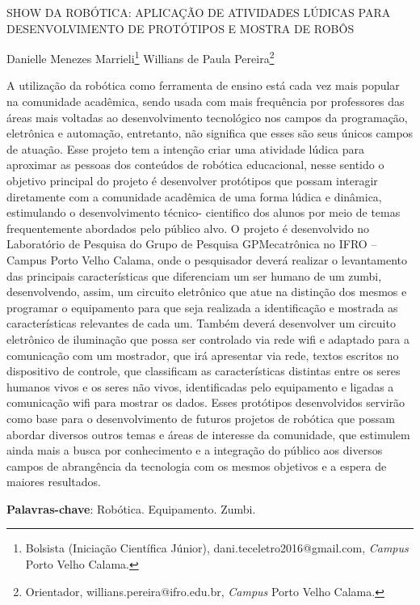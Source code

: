 \documentclass[article,12pt,onesidea,4paper,english,brazil]{abntex2}
\begin{document}
	
	
	\frenchspacing 
	
	\begin{center}
		\LARGE SHOW DA ROBÓTICA: APLICAÇÃO DE ATIVIDADES LÚDICAS PARA DESENVOLVIMENTO DE PROTÓTIPOS E MOSTRA DE ROBÔS
		
		\normalsize
		Danielle Menezes Marrieli\footnote{Bolsista (Iniciação Científica Júnior), dani.teceletro2016@gmail.com, \textit{Campus} Porto Velho Calama.} 
		Willians de Paula Pereira\footnote{Orientador, willians.pereira@ifro.edu.br, \textit{Campus} Porto Velho Calama.} 
	\end{center}
	
	\noindent A utilização da robótica como ferramenta de ensino está cada vez mais popular na
	comunidade acadêmica, sendo usada com mais frequência por professores das áreas
	mais voltadas ao desenvolvimento tecnológico nos campos da programação,
	eletrônica e automação, entretanto, não significa que esses são seus únicos campos
	de atuação. Esse projeto tem a intenção criar uma atividade lúdica para aproximar as
	pessoas dos conteúdos de robótica educacional, nesse sentido o objetivo principal do
	projeto é desenvolver protótipos que possam interagir diretamente com a comunidade	
	acadêmica de uma forma lúdica e dinâmica, estimulando o desenvolvimento técnico-
	cientifico dos alunos por meio de temas frequentemente abordados pelo público alvo.	
	O projeto é desenvolvido no Laboratório de Pesquisa do Grupo de Pesquisa
	GPMecatrônica no IFRO – Campus Porto Velho Calama, onde o pesquisador deverá
	realizar o levantamento das principais características que diferenciam um ser humano
	de um zumbi, desenvolvendo, assim, um circuito eletrônico que atue na distinção dos
	mesmos e programar o equipamento para que seja realizada a identificação e
	mostrada as características relevantes de cada um. Também deverá desenvolver um
	circuito eletrônico de iluminação que possa ser controlado via rede wifi e adaptado
	para a comunicação com um mostrador, que irá apresentar via rede, textos escritos
	no dispositivo de controle, que classificam as características distintas entre os seres
	humanos vivos e os seres não vivos, identificadas pelo equipamento e ligadas a
	comunicação wifi para mostrar os dados. Esses protótipos desenvolvidos servirão
	como base para o desenvolvimento de futuros projetos de robótica que possam
	abordar diversos outros temas e áreas de interesse da comunidade, que estimulem
	ainda mais a busca por conhecimento e a integração do público aos diversos campos
	de abrangência da tecnologia com os mesmos objetivos e a espera de maiores
	resultados.
	
	\vspace{\onelineskip}
	
	\noindent
	\textbf{Palavras-chave}: Robótica. Equipamento. Zumbi.
	
\end{document}
